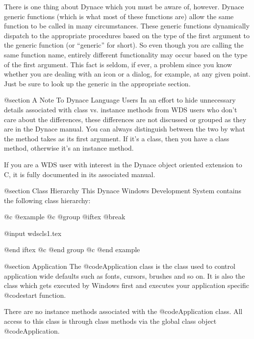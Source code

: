 There is one thing about Dynace which you must be aware of, however.
Dynace generic functions (which is what most of these functions are)
allow the same function to be called in many circumstances.  These
generic functions dynamically dispatch to the appropriate procedures
based on the type of the first argument to the generic function (or
``generic'' for short).  So even though you are calling the same
function name, entirely different functionality may occur based on the
type of the first argument.  This fact is seldom, if ever, a problem
since you know whether you are dealing with an icon or a dialog, for
example, at any given point.  Just be sure to look up the generic in
the appropriate section.


@section A Note To Dynace Language Users
In an effort to hide unnecessary details associated with class vs.
instance methods from WDS users who don't care about the differences,
these differences are not discussed or grouped as they are in the
Dynace manual.  You can always distinguish between the two by what
the method takes as its first argument.  If it's a class, then you
have a class method, otherwise it's an instance method.

If you are a WDS user with interest in the Dynace object oriented
extension to C, it is fully documented in its associated manual.




@section Class Hierarchy
This Dynace Windows Development System contains the following class
hierarchy:

@c @example
@c @group
@iftex
@break

@input wdscls1.tex


@end iftex
@c @end group
@c @end example





@section Application
The @code{Application} class is the class used to control application
wide defaults such as fonts, cursors, brushes and so on.  It is also
the class which gets executed by Windows first and executes your
application specific @code{start} function.

There are no instance methods associated with the @code{Application} class.
All access to this class is through class methods via the global class
object @code{Application}.














